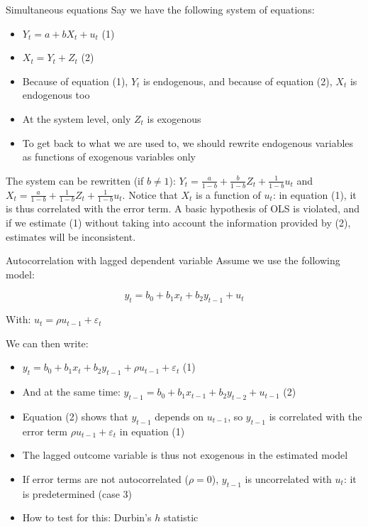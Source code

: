 \documentclass[aspectratio=169]{beamer}
\begin{document}
\begin{frame}{Simultaneous equations}
Say we have the following system of equations:
\begin{itemize}
    \item $Y_t = a + bX_t + u_t$ (1)
    \item $X_t = Y_t + Z_t$ (2)
    \item Because of equation (1), $Y_t$ is endogenous, and because of equation (2), $X_t$ is endogenous too
    \item At the system level, only $Z_t$ is exogenous
    \item To get back to what we are used to, we should rewrite endogenous variables as functions of exogenous variables only
\end{itemize}

The system can be rewritten (if $b \neq 1$): $Y_t = \frac{a}{1-b} + \frac{b}{1-b}Z_t + \frac{1}{1-b}u_t$ and $X_t = \frac{a}{1-b} + \frac{1}{1-b}Z_t + \frac{1}{1-b}u_t$. Notice that $X_t$ is a function of $u_t$: in equation (1), it is thus correlated with the error term. A basic hypothesis of OLS is violated, and if we estimate (1) without taking into account the information provided by (2), estimates will be inconsistent.
\end{frame}

\begin{frame}{Autocorrelation with lagged dependent variable}
Assume we use the following model:

\[y_t = b_0 + b_1x_t + b_2y_{t-1} + u_t\]

With: $u_t = \rho u_{t-1} + \varepsilon_t$

We can then write:
\begin{itemize}
    \item $y_t = b_0 + b_1x_t + b_2y_{t-1} + \rho u_{t-1} + \varepsilon_t$ (1)
    \item And at the same time: $y_{t-1} = b_0 + b_1x_{t-1} + b_2y_{t-2} + u_{t-1}$ (2)
    \item Equation (2) shows that $y_{t-1}$ depends on $u_{t-1}$, so $y_{t-1}$ is correlated with the error term $\rho u_{t-1} + \varepsilon_t$ in equation (1)
    \item The lagged outcome variable is thus not exogenous in the estimated model
    \item If error terms are not autocorrelated ($\rho = 0$), $y_{t-1}$ is uncorrelated with $u_t$: it is predetermined (case 3)
    \item How to test for this: Durbin's $h$ statistic
\end{itemize}
\end{frame}
\end{document}
